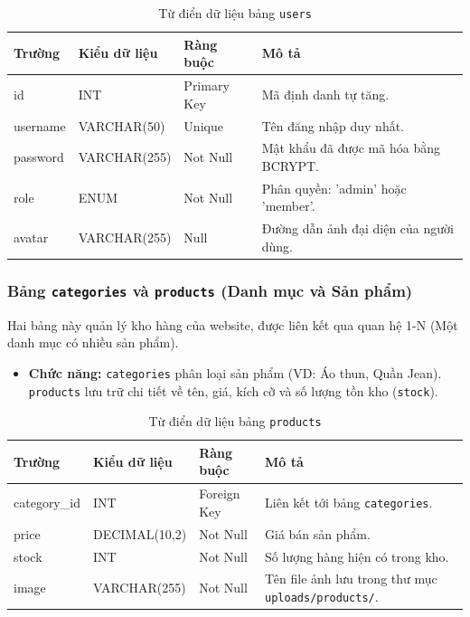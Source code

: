\begin{table}[h!]
\centering
\small
\begin{tabularx}{\textwidth}{|l|l|l|X|}
\hline
\textbf{Trường} & \textbf{Kiểu dữ liệu} & \textbf{Ràng buộc} & \textbf{Mô tả} \\ \hline
id & INT & Primary Key & Mã định danh tự tăng. \\ \hline
username & VARCHAR(50) & Unique & Tên đăng nhập duy nhất. \\ \hline
password & VARCHAR(255) & Not Null & Mật khẩu đã được mã hóa bằng BCRYPT. \\ \hline
role & ENUM & Not Null & Phân quyền: 'admin' hoặc 'member'. \\ \hline
avatar & VARCHAR(255) & Null & Đường dẫn ảnh đại diện của người dùng. \\ \hline
\end{tabularx}
\caption{Từ điển dữ liệu bảng \texttt{users}}
\end{table}

\subsubsection{Bảng \texttt{categories} và \texttt{products} (Danh mục và Sản phẩm)}
Hai bảng này quản lý kho hàng của website, được liên kết qua quan hệ 1-N (Một danh mục có nhiều sản phẩm).
\begin{itemize}
    \item \textbf{Chức năng:} \texttt{categories} phân loại sản phẩm (VD: Áo thun, Quần Jean). \texttt{products} lưu trữ chi tiết về tên, giá, kích cỡ và số lượng tồn kho (\texttt{stock}).
\end{itemize}

\begin{table}[h!]
\centering
\small
\begin{tabularx}{\textwidth}{|l|l|l|X|}
\hline
\textbf{Trường} & \textbf{Kiểu dữ liệu} & \textbf{Ràng buộc} & \textbf{Mô tả} \\ \hline
category\_id & INT & Foreign Key & Liên kết tới bảng \texttt{categories}. \\ \hline
price & DECIMAL(10,2) & Not Null & Giá bán sản phẩm. \\ \hline
stock & INT & Not Null & Số lượng hàng hiện có trong kho. \\ \hline
image & VARCHAR(255) & Not Null & Tên file ảnh lưu trong thư mục \texttt{uploads/products/}. \\ \hline
\end{tabularx}
\caption{Từ điển dữ liệu bảng \texttt{products}}
\end{table}

